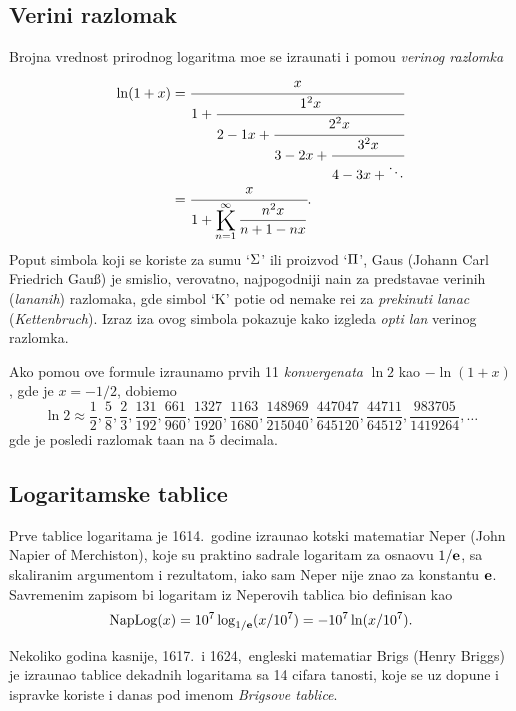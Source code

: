 \documentclass[12pt, twoside, a4paper]{article}
\def\idx#1{#1\index{#1}}
\def\K{\mathop{\vcenter{\hbox{\rm\huge K}}}\limits}
\def\n{n}
\def\Ki{\K_{\n=1}}
\def\Kinf#1#2{\Ki^\infty\displaystyle{\frac{#1}{#2}}}
\def\e{{\bf e}}
\def\naplog{\mathop{\rm NapLog}\nolimits}
\begin{document}
\subsection{Veri{\zv}ni razlomak}

Brojna vrednost prirodnog logaritma mo{\zv}e se izra{\cv}unati i pomo{\cc}u {\sl veri{\zv}nog razlomka}
\begin{equation}\label{eq:verige}
\begin{aligned}
\ln(1+x)
&=\cfrac{x}{1+\cfrac{1^2x}{2-1x+\cfrac{2^2x}{3-2x+\cfrac{3^2x}{4-3x+\ddots}}}}\\
\noalign{\vskip-3pt}
&=\cfrac{x}{1+ \Kinf{\n^2x}{\n+1-\n x}}.
\end{aligned}
\end{equation}
Poput simbola koji se koriste za sumu `$\rm\Sigma$' ili proizvod `$\rm\Pi$', 
\idx{Gaus} (Johann Carl Friedrich Gau\ss) je smislio, verovatno, najpogodniji na{\cv}in za predstav{\lj}a{\nj}e
veri{\zv}nih ({\sl lan\-{\cv}a\-nih\/}) razlomaka,
gde simbol `K' poti{\cv}e od nema{\cv}ke re{\cv}i za {\sl prekinuti lanac\/} ({\sl Kettenbruch\/}). 
Izraz iza ovog simbola pokazuje kako izgleda {\sl op{\sv}ti {\cv}lan\/} veri{\zv}nog razlomka.

\def\ff#1/#2,{\frac{#1}{#2},}
Ako pomo{\cc}u ove formule izra{\cv}unamo prvih 11 {\sl konvergenata\/} $\ln2$ kao $-\ln(1+x)$, 
gde je $x=-1/2$,
dobi{\cc}emo
$$
\ln2\approx\ff1/2, \ff5/8, \ff2/3, \ff131/192, \ff661/960, \ff1327/1920, \ff1163/1680, \ff148969/215040, 
\ff447047/645120, \ff44711/64512, \ff983705/1419264, \dots
$$
gde je posled{\nj}i razlomak ta{\cv}an na 5 decimala.


\subsection{Logaritamske tablice}

Prve tablice logaritama je 1614.\ godine izra{\cv}unao {\sv}kotski matemati{\cv}ar \idx{Neper} (John Napier of Merchiston),
koje su prakti{\cv}no sadr{\zv}ale logaritam za osnaovu $1/\e$, sa ska\-li\-ra\-nim argumentom i rezultatom,
iako sam Neper nije znao za konstantu $\e$.
Savremenim zapisom bi logaritam iz Neperovih tablica bio definisan kao
$$
\naplog (x) = 10^7\log_{1/\e}(x/10^7) = -10^7\ln(x/10^7).
$$

Nekoliko godina kasnije, 1617.\ i 1624,\ engleski matemati{\cv}ar \idx{Brigs} (Henry Briggs) je izra{\cv}unao
tablice de\-kad\-nih logaritama sa 14 cifara ta{\cv}nosti, koje se uz dopune i ispravke
koriste i danas pod imenom {\sl Brigsove tablice}.
\end{document}
